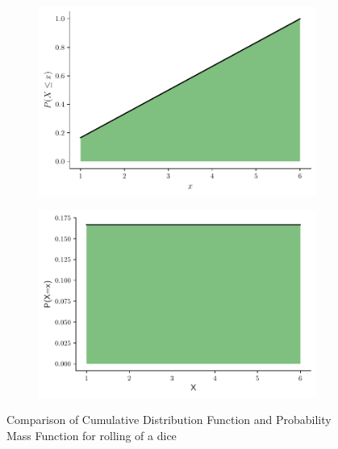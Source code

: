 \documentclass[twoside,12pt]{report}  %
\begin{document}
\begin{tcolorbox}[colback=blue!5!white, colframe=blue!75!black, title = \textbf{Cumulative Distribution Function for Discreet Random Variable }]
	\begin{figure}[H]
		\centering
			\begin{subfigure}[b]{0.3\textwidth}
				\includegraphics[width=\textwidth]{./images/cumulativedistributionfunction_dicrete_example.pdf}
			\end{subfigure}
			\begin{subfigure}[b]{0.3\textwidth}
				\includegraphics[width=\textwidth]{./images/figure_probabilitymassfunction_example.pdf}
			\end{subfigure}
			\caption{Comparison of Cumulative Distribution Function and Probability Mass Function for rolling of a dice}
	\end{figure}

\end{tcolorbox}
\noindent
\\
\end{document}
